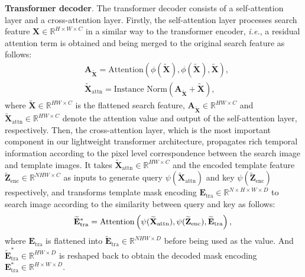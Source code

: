 \documentclass[10pt,twocolumn,letterpaper]{article}
\begin{document}
\noindent\textbf{Transformer decoder}.
The transformer decoder consists of a self-attention layer and a cross-attention layer. Firstly, the self-attention layer processes search feature $\mathbf{X} \in \mathbb{R}^{H \times W \times C}$ in a similar way to the transformer encoder, \textit{i.e.}, a residual attention term is obtained and being merged to the original search feature as follows:
\begin{equation}
	\begin{aligned}
		&\mathbf{A}_{\widetilde{\mathbf{X}}} = 
		\text{Attention}
		\left( \phi(\widetilde{\mathbf{X}}),\phi(\widetilde{\mathbf{X}}), \widetilde{\mathbf{X}}
		\right),  \\
		&\widetilde{\mathbf{X}}_{\text{attn}} = \text{Instance Norm}\left( \mathbf{A}_{\widetilde{\mathbf{X}}} + \widetilde{\mathbf{X}} \right),
	\end{aligned}
\end{equation}
where $\widetilde{\mathbf{X}} \in \mathbb{R}^{HW \times C}$ is the flattened search feature, $\mathbf{A}_{\widetilde{\mathbf{X}}} \in \mathbb{R}^{HW \times C}$ and $\widetilde{\mathbf{X}}_{\text{attn}} \in \mathbb{R}^{HW \times C}$ denote the attention value and output of the self-attention layer, respectively. Then, the cross-attention layer, which is the most important component in our lightweight transformer architecture, propagates rich temporal information according to the pixel level correspondence between the search image and template images. It takes $\widetilde{\mathbf{X}}_{\text{attn}} \in \mathbb{R}^{HW \times C}$  and the encoded template feature $\widetilde{\mathbf{Z}}_{\text{enc}} \in \mathbb{R}^{NHW \times C}$ as inputs to generate query $\psi(\widetilde{\mathbf{X}}_{\text{attn}})$ and key $\psi(\widetilde{\mathbf{Z}}_{\text{enc}})$ respectively, and transforms template mask encoding $\mathbf{E}_{\text{tra}} \in \mathbb{R}^{N \times H \times W \times D}$ to search image according to the similarity between query and key as follows:
\begin{equation}
	\widetilde{\mathbf{E}}_{\text{tra}}^{*} =
	\text{Attention}
	\left( \psi(\widetilde{\mathbf{X}}_{\text{attn}}),\psi(\widetilde{\mathbf{Z}}_{\text{enc}}), \widetilde{\mathbf{E}}_{\text{tra}}
	\right),  \\
\end{equation}
where $\mathbf{E}_{\text{tra}}$ is flattened into $\widetilde{\mathbf{E}}_{\text{tra}} \in \mathbb{R}^{NHW \times D}$ before being used as the value. And $\widetilde{\mathbf{E}}_{\text{tra}}^{*} \in \mathbb{R}^{HW \times D}$ is reshaped back to obtain the decoded mask encoding $\mathbf{E}_{\text{tra}}^{*} \in \mathbb{R}^{H \times W \times D}$. 
\end{document}
